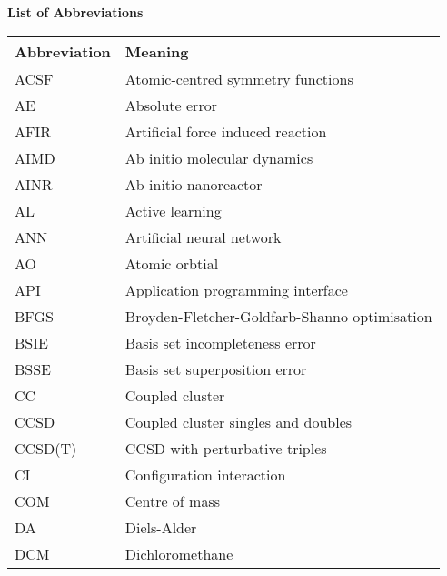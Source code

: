 \documentclass[../main.tex]{subfiles}
\begin{document}
\begin{center}
		{\bfseries\Large \textsf{List of Abbreviations}}
\end{center}
\begin{table}[h!]
\def\arraystretch{2.0}
\begin{tabularx}{\textwidth}{YY}
Abbreviation & Meaning \\
\hline
ACSF	&	Atomic-centred symmetry functions	\\
AE	&	Absolute error	\\
AFIR	&	Artificial force induced reaction	\\
AIMD	&	Ab initio molecular dynamics	\\
AINR	&	Ab initio nanoreactor	\\
AL	&	Active learning	\\
ANN	&	Artificial neural network	\\
AO	&	Atomic orbtial	\\
API	&	Application programming interface	\\
BFGS	&	Broyden-Fletcher-Goldfarb-Shanno optimisation	\\
BSIE	&	Basis set incompleteness error	\\
BSSE	&	Basis set superposition error	\\
CC	&	Coupled cluster	\\
CCSD	&	Coupled cluster singles and doubles	\\
CCSD(T)	&	CCSD with perturbative triples	\\
CI	&	Configuration interaction	\\
COM	&	Centre of mass	\\
DA	&	Diels-Alder	\\
DCM	&	Dichloromethane	\\
\end{tabularx}
\end{table}
\newpage
\end{document}
